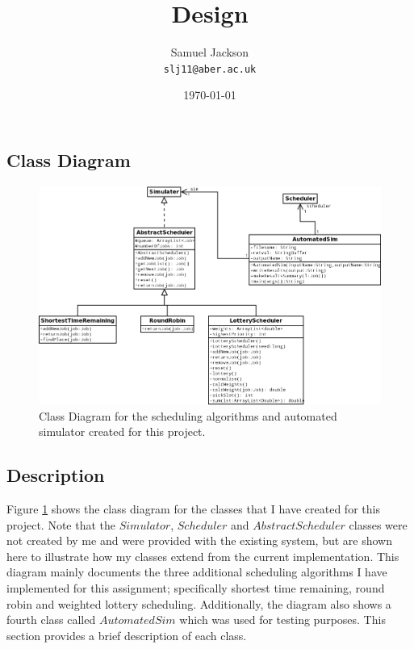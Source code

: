 \documentclass{article}
\begin{document}
\title{Design}
\author{Samuel Jackson \\ \texttt{slj11@aber.ac.uk}}
\date{\today}
\maketitle

\newpage
\begin{landscape}
\section{Class Diagram}

\begin{figure}[H]
\centering
\includegraphics[width=1.1\textwidth]{class_diagram.png}
\caption{Class Diagram for the scheduling algorithms and automated simulator created for this project.}
\label{fig:class-diagram}
\end{figure}
\end{landscape}

\subsection{Description}
Figure \ref{fig:class-diagram} shows the class diagram for the classes that I have created for this project. Note that the $Simulator$, $Scheduler$ and $AbstractScheduler$ classes were not created by me and were provided with the existing system, but are shown here to illustrate how my classes extend from the current implementation. This diagram mainly documents the three additional scheduling algorithms I have implemented for this assignment; specifically shortest time remaining, round robin and weighted lottery scheduling. Additionally, the diagram also shows a fourth class called $AutomatedSim$ which was used for testing purposes. This section provides a brief description of each class.
\end{document}
